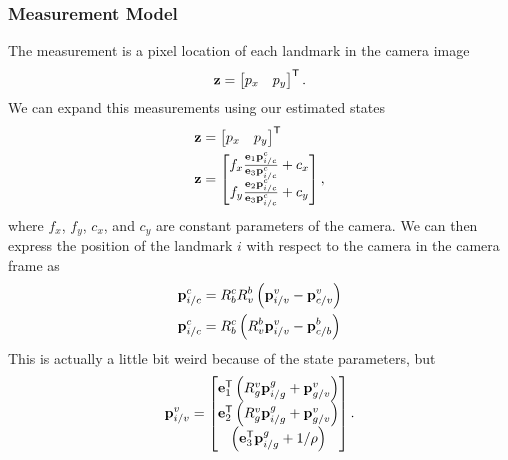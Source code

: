 \subsubsection{Measurement Model}
The measurement is a pixel location of each landmark in the camera image
\begin{equation}
  \boldsymbol{\mathrm{z}} =
  \begin{bmatrix}
    p_x & p_y
  \end{bmatrix}^{\mathsf{T}}.
\end{equation}
We can expand this measurements using our estimated states
\begin{align}
  \boldsymbol{\mathrm{z}} &=
  \begin{bmatrix}
    p_x & p_y
  \end{bmatrix}^{\mathsf{T}} \\
  \boldsymbol{\mathrm{z}} &=
  \begin{bmatrix}
    f_x \frac{\boldsymbol{\mathrm{e}}_1 \boldsymbol{\mathrm{p}}_{i/c}^c}{\boldsymbol{\mathrm{e}}_3 \boldsymbol{\mathrm{p}}_{i/c}^c} + c_x \\
    f_y \frac{\boldsymbol{\mathrm{e}}_2 \boldsymbol{\mathrm{p}}_{i/c}^c}{\boldsymbol{\mathrm{e}}_3 \boldsymbol{\mathrm{p}}_{i/c}^c} + c_y
  \end{bmatrix},
\end{align}
where $f_x$, $f_y$, $c_x$, and $c_y$ are constant parameters of the camera. We
can then express the position of the landmark $i$ with respect to the camera in the
camera frame as
\begin{align}
  \boldsymbol{\mathrm{p}}_{i/c}^c &= R_b^c R_v^b \left(\boldsymbol{\mathrm{p}}_{i/v}^v -
    \boldsymbol{\mathrm{p}}_{c/v}^v\right) \\
    \boldsymbol{\mathrm{p}}_{i/c}^c &= R_b^c \left(R_v^b \boldsymbol{\mathrm{p}}_{i/v}^v -
    \boldsymbol{\mathrm{p}}_{c/b}^b\right)
\end{align}
This is actually a little bit weird because of the state parameters, but
\begin{equation}
  \boldsymbol{\mathrm{p}}_{i/v}^v =
  \begin{bmatrix}
    \boldsymbol{\mathrm{e}}_1^{\mathsf{T}} \left( R_g^v \boldsymbol{\mathrm{p}}_{i/g}^g + \boldsymbol{\mathrm{p}}_{g/v}^v \right) \\
    \boldsymbol{\mathrm{e}}_2^{\mathsf{T}} \left( R_g^v \boldsymbol{\mathrm{p}}_{i/g}^g + \boldsymbol{\mathrm{p}}_{g/v}^v \right) \\
    \left( \boldsymbol{\mathrm{e}}_3^{\mathsf{T}} \boldsymbol{\mathrm{p}}_{i/g}^g + 1 / \rho \right)
  \end{bmatrix}.
\end{equation}

